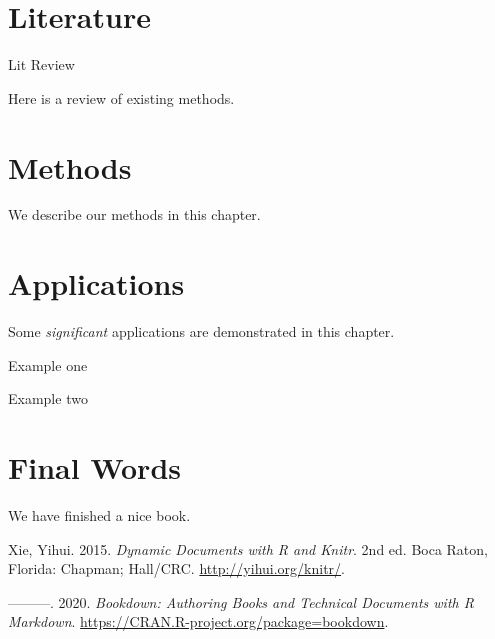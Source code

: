 \documentclass[
  ignorenonframetext,
  noamsthm,11pt,a4paper,blue,xcolor=table]{beamer}
\begin{document}
\hypertarget{literature}{%
\section{Literature}\label{literature}}

\begin{frame}{Lit Review}
\protect\hypertarget{lit-review}{}

Here is a review of existing methods.

\end{frame}

\hypertarget{methods}{%
\section{Methods}\label{methods}}

We describe our methods in this chapter.

\hypertarget{applications}{%
\section{Applications}\label{applications}}

Some \emph{significant} applications are demonstrated in this chapter.

\begin{frame}{Example one}
\protect\hypertarget{example-one}{}

\end{frame}

\begin{frame}{Example two}
\protect\hypertarget{example-two}{}

\end{frame}

\hypertarget{final-words}{%
\section{Final Words}\label{final-words}}

We have finished a nice book.

\hypertarget{refs}{}
\leavevmode\hypertarget{ref-xie2015}{}%
Xie, Yihui. 2015. \emph{Dynamic Documents with R and Knitr}. 2nd ed. Boca Raton, Florida: Chapman; Hall/CRC. \url{http://yihui.org/knitr/}.

\leavevmode\hypertarget{ref-R-bookdown}{}%
---------. 2020. \emph{Bookdown: Authoring Books and Technical Documents with R Markdown}. \url{https://CRAN.R-project.org/package=bookdown}.

\mode*
\end{document}
